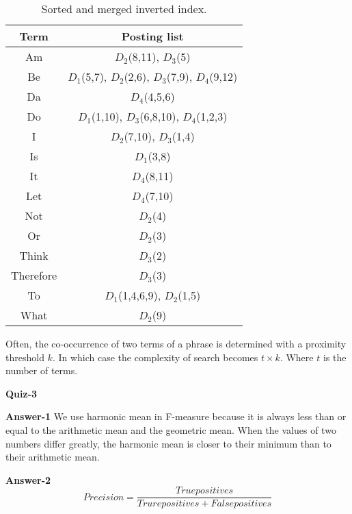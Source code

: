 \documentclass[10pt,onecolumn,letterpaper]{article}
\begin{document}
\begin{table}
\begin{center}
\begin{tabular}{|c|c|}
\hline
\textbf{Term} & \textbf{Posting list}	 \\\hline
Am & $D_2$(8,11), $D_3$(5)\\\hline
Be   & $D_1$(5,7), $D_2$(2,6), $D_3$(7,9), $D_4$(9,12)	\\\hline
Da & $D_4$(4,5,6)\\\hline
Do   & $D_1$(1,10), $D_3$(6,8,10), $D_4$(1,2,3)	\\\hline
I & $D_2$(7,10), $D_3$(1,4)\\\hline
Is   & $D_1$(3,8) \\\hline
It & $D_4$(8,11)\\\hline
Let & $D_4$(7,10)\\\hline
Not  & $D_2$(4)	\\\hline
Or   & $D_2$(3) 	\\\hline
Think & $D_3$(2)\\\hline
Therefore & $D_3$(3)\\\hline
To   & $D_1$(1,4,6,9), $D_2$(1,5) \\\hline
What & $D_2$(9)\\\hline
\end{tabular}
\end{center}
\caption{\label{table:tb1}Sorted and merged inverted index.}
\end{table}

\noindent Often, the co-occurrence of two  terms of a phrase is determined with a proximity threshold $k$. In which case the complexity of search becomes $t\times k$. Where $t$ is the number of terms. 

\vspace{12pt}

\noindent\textbf{Quiz-3}

\vspace{12pt}

\noindent\textbf{Answer-1}
We use harmonic mean in F-measure because it is always less than or equal to the arithmetic mean and the geometric mean. When the values of two numbers differ greatly, the harmonic mean is closer to their minimum than to their arithmetic mean.

\vspace{12pt}

\noindent\textbf{Answer-2}
\begin{equation}
Precision=\frac{True positives}{Trure positives+ False positives}
\end{equation}
\end{document}
